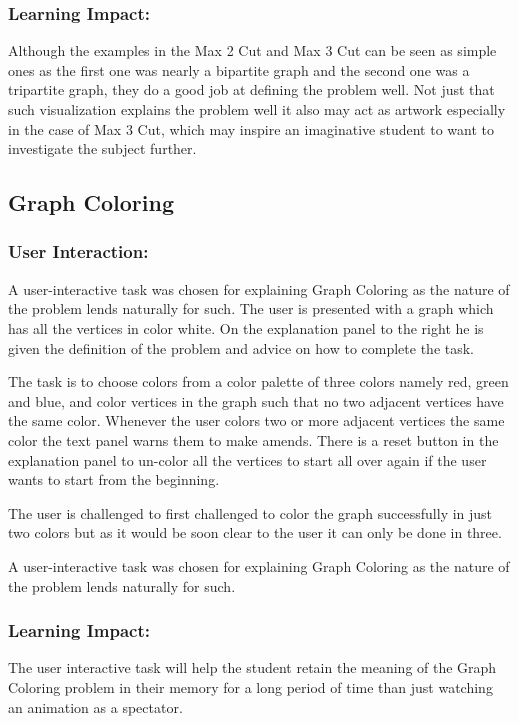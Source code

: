 \subsubsection{Learning Impact:}
Although the examples in the Max 2 Cut and Max 3 Cut can be seen as simple ones
as the first one was nearly a bipartite graph and the second one was a
tripartite graph, they do a good job at defining the problem well. 
Not just that such visualization explains the problem well it also may act
as artwork especially in the case of Max 3 Cut, which may inspire an
imaginative student to want to investigate the subject further.


\subsection{Graph Coloring}
\subsubsection{User Interaction:}
A user-interactive task was chosen for explaining Graph Coloring as the nature
of the problem lends naturally for such.  The user is presented with a graph
which has all the vertices in color white.  On the explanation panel to the
right he is given the definition of the problem and advice on how to complete
the task.  

The task is to choose colors from a color palette of three colors namely red,
green and blue, and color vertices in the graph such that no two adjacent
vertices have the same color. Whenever the user colors two or more adjacent
vertices the same color the text panel warns them to make amends. There is a
reset button in the explanation panel to un-color all the vertices to start all
over again if the user wants to start from the beginning.

The user is challenged to first challenged to color the graph successfully in
just two colors but as it would be soon clear to the user it can only be done
in three.

A user-interactive task was chosen for explaining Graph Coloring as the nature
of the problem lends naturally for such.

\subsubsection{Learning Impact:}
The user interactive task will help the student retain the meaning of the Graph
Coloring problem in their memory for a long period of time than just watching
an animation as a spectator.

